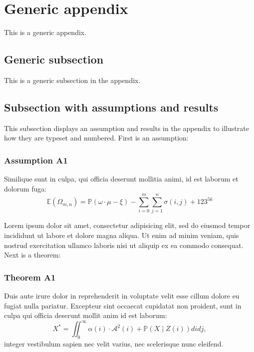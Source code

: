 \documentclass{article}
\begin{document}
\section{Generic appendix}\label{a:appendix1}

This is a generic appendix. \wcTpLoremIpsum*[type=sentence,words-per-sentence=52,seed=160]{}  

\subsection{Generic subsection} 

This is a generic subsection in the appendix. \wcTpLoremIpsum*[type=sentence,words-per-sentence=36,seed=161]{}  

 \wcTpLoremIpsum*[type=sentence,words-per-sentence=48,seed=162]{}  

 \wcTpLoremIpsum*[type=sentence,words-per-sentence=103,seed=163]{}  

\subsection{Subsection with assumptions and results}

This subsection displays an assumption and results in the appendix to illustrate how they are typeset and numbered. First is an assumption:
\subsubsection*{Assumption A1}
 
Similique sunt in culpa, qui officia deserunt mollitia animi, id est laborum et dolorum fuga:
\[

\mathbb{E}(\Omega_{m,n}) = \mathbb{P}(\omega\cdot \mu - \xi) - \sum_{i=0}^{m}\sum_{j=1}^{n} \sigma(i,j) + 123^{56}

\]
 \wcTpLoremIpsum*[type=sentence,words-per-sentence=26,seed=164]{} 
\setcounter{paperref}{0}\label{a:appe}

Lorem ipsum dolor sit amet, consectetur adipisicing elit, sed do eiusmod
tempor incididunt ut labore et dolore magna aliqua. Ut enim ad minim veniam,
quis nostrud exercitation ullamco laboris nisi ut aliquip ex ea commodo
consequat. Next is a theorem:
\subsubsection*{Theorem A1}

Duis aute irure dolor in reprehenderit in voluptate velit esse
cillum dolore eu fugiat nulla pariatur. Excepteur sint occaecat cupidatat non
proident, sunt in culpa qui officia deserunt mollit anim id est laborum:
\[

X^* =\iint_{0}^{\infty} \alpha(i) \cdot \mathcal{A}^2(i) + \mathbb{P}(X\mid Z(i)) di dj,\tag{A1}
\]
integer vestibulum sapien nec velit varius, nec scelerisque nunc eleifend. \wcTpLoremIpsum*[type=sentence,words-per-sentence=17,seed=165]{}  
\end{document}
